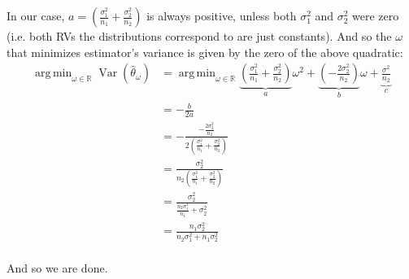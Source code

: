 \documentclass{article}
\DeclareMathOperator{\Var}{Var}
\DeclareMathOperator*{\argmin}{arg\,min}
\begin{document}
In our case, $a=\left(\frac{\sigma^2_1}{n_1}+\frac{\sigma^2_2}{n_2}\right)$ is always positive, unless both $\sigma^2_1$ and $\sigma^2_2$ were zero (i.e. both RVs the distributions correspond to are just constants). And so the $\omega$ that minimizes estimator's variance is given by the zero of the above quadratic:
\begin{align*}
    \argmin_{\omega\in\mathbb R}\Var(\hat\theta_\omega)&=\argmin_{\omega\in\mathbb R}\underbrace{\left(\frac{\sigma^2_1}{n_1}+\frac{\sigma^2_2}{n_2}\right)}_{a}\omega^2+\underbrace{\left(-\frac{2\sigma^2_2}{n_2}\right)}_{b}\omega+\underbrace{\frac{\sigma^2}{n_2}}_{c}\\
    &=-\frac{b}{2a}\tag{zero of a quadratic}\\
    &=-\frac{-\frac{2\sigma^2_2}{n_2}}{2\left(\frac{\sigma^2_1}{n_1}+\frac{\sigma^2_2}{n_2}\right)}\\
    &=\frac{\sigma^2_2}{n_2\left(\frac{\sigma^2_1}{n_1}+\frac{\sigma^2_2}{n_2}\right)}\\
    &=\frac{\sigma^2_2}{\frac{n_2\sigma^2_1}{n_1}+\sigma^2_2}\\
    &=\frac{n_1\sigma^2_2}{n_2\sigma^2_1+n_1\sigma^2_2}\\
\end{align*}

And so we are done.
\end{document}
